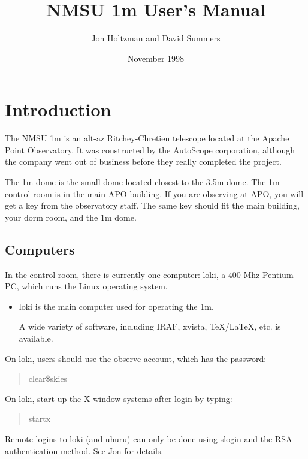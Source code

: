 \documentclass[10pt]{report}
\title{\Huge\bf NMSU 1m User's Manual}
\author{\Large
Jon Holtzman
and
David Summers
}
\date{\Large November 1998}
\renewcommand{\[}{\begin{eqnarray}}
\renewcommand{\]}{\end{eqnarray}}
\begin{document}
\setcounter{page}{1}

\maketitle

\tableofcontents

\clearpage

\setcounter{page}{1}


\chapter{Introduction}

The NMSU 1m is an alt-az Ritchey-Chretien telescope located at the Apache
Point Observatory. It was constructed by the AutoScope corporation, although
the company went out of business before they really completed the project.

The 1m dome is the small dome located closest to the 3.5m dome.
The 1m control room is in the main APO building. If you are observing at
APO, you will get a key from the observatory staff. The same key should fit the
main building, your dorm room, and the 1m dome.

\section{Computers }
In the control room, there is currently one computer: 
loki, a 400 Mhz Pentium PC, which runs the Linux operating system.

\begin{itemize}

\item loki is the main computer used for operating the 1m. 

A wide variety of software, including IRAF, xvista, TeX/LaTeX, etc. is 
available.
\end{itemize}

On loki, users should use the observe account, which has the password:
\begin{quote}
clear\$skies
\end{quote}

On loki, start up the X window systems after login by typing:  
\begin{quote}
startx
\end{quote}

Remote logins to loki (and uhuru) can only be done using slogin and the RSA
authentication method. See Jon for details.
\end{document}
